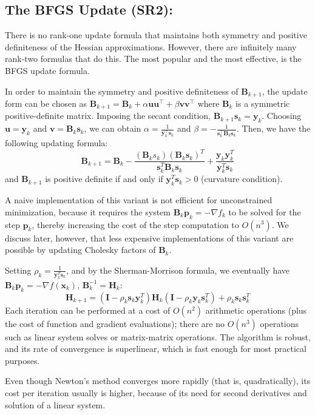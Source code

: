 \documentclass[11pt]{article}
\theoremstyle{plain} %
\newenvironment{topic}
{\color{C2}\normalfont\begin{framed}\begingroup }
  {\endgroup\end{framed}}
\theoremstyle{remark}
\newenvironment{remark}
  {\pushQED{\qed}\renewcommand{\qedsymbol}{$\triangle$}\remarkx}
  {\popQED\endremarkx}
\begin{document}
\subsection{The BFGS Update (SR2):}
\begin{topic}
  There is no rank-one update formula that maintains both symmetry and positive
  definiteness of the Hessian approximations. However, there are infinitely many
  rank-two formulas that do this. The most popular and the most effective, is the BFGS update formula.

  In order to maintain the
  symmetry and positive definiteness of $\mathbf{B}_{k+1}$, the update form can
  be chosen as $\mathbf{B}_{k+1}=\mathbf{B}_k+\alpha \mathbf{u}
    \mathbf{u}^{\top}+\beta \mathbf{v} \mathbf{v}^{\top}$ where $\mathbf{B}_k$ is a
  symmetric positive-definite matrix. Imposing the secant
  condition, $\mathbf{B}_{k+1} \mathbf{s}_k=\mathbf{y}_k$. Choosing
  $\mathbf{u}=\mathbf{y}_k$ and $\mathbf{v}=\mathbf{B}_k \mathbf{s}_k$, we can
  obtain $\alpha =\frac{1}{\mathbf{y}_k^\top \mathbf{s}_k}$ and $\beta =-\frac{1}{\mathbf{s}_k^\top \mathbf{B}_k \mathbf{s}_k}$.
  Then, we have the following updating formula:
  $$
    \mathbf{B}_{k+1}=\mathbf{B}_k-\frac{\left(\mathbf{B}_k s_k\right)\left(\mathbf{B}_k \mathbf{s}_k\right)^T}{\mathbf{s}_k^T \mathbf{B}_k \mathbf{s}_k}+\frac{\mathbf{y}_k \mathbf{y}_k^T}{\mathbf{y}_k^T \mathbf{s}_k}
  $$
  and $\mathbf{B}_{k+1}$ is positive definite if
  and only if $\mathbf{y}_k^T \mathbf{s}_k>0$ (curvature condition).

  A naive implementation of this variant is not efficient for unconstrained
  minimization, because it requires the system $\mathbf{B}_k
    \mathbf{p}_k=-\nabla f_k$ to be solved for the step $\mathbf{p}_k$, thereby
  increasing the cost of the step computation to $O\left(n^3\right)$. We discuss
  later, however, that less expensive implementations of this variant are
  possible by updating Cholesky factors of $\mathbf{B}_k$.

  Setting $\rho_k=\frac{1}{\mathbf{y}_k^T \mathbf{s}_k}$, and by the Sherman-Morrison formula,
  we eventually have $\mathbf{B}_k \mathbf{p}_k = -\nabla f\left(\mathbf{x}_k\right)$, $\mathbf{B}_{k}^{-1} = \mathbf{H}_k$:
  $$
    \mathbf{H}_{k+1}=\left(\mathbf{I}-\rho_k \mathbf{s}_k \mathbf{y}_k^T\right) \mathbf{H}_k\left(\mathbf{I}-\rho_k \mathbf{y}_k \mathbf{s}_k^T\right)+\rho_k \mathbf{s}_k \mathbf{s}_k^T
  $$
  Each iteration can be performed at a cost of $O(n^2)$ arithmetic operations (plus
  the cost of function and gradient evaluations); there are no $O(n^3)$ operations
  such as linear system solves or matrix-matrix operations. The algorithm is
  robust, and its rate of convergence is superlinear, which is fast enough for
  most practical purposes.

  \begin{remark}
    Even though Newton's method converges more rapidly
    (that is, quadratically), its cost per iteration usually is higher, because of
    its need for second derivatives and solution of a linear system.
  \end{remark}
\end{topic}
\end{document}
